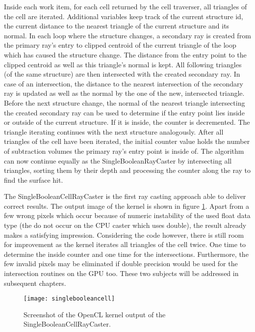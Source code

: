 Inside each work item, for each cell returned by the cell traverser, all triangles of the cell are iterated. Additional variables keep track of the current structure id, the current distance to the nearest triangle of the current structure and its normal. In each loop where the structure changes, a secondary ray is created from the primary ray's entry to clipped centroid of the current triangle of the loop which has caused the structure change. The distance from the entry point to the clipped centroid as well as this triangle's normal is kept. All following triangles (of the same structure) are then intersected with the created secondary ray. In case of an intersection, the distance to the nearest intersection of the secondary ray is updated as well as the normal by the one of the new, intersected triangle. Before the next structure change, the normal of the nearest triangle intersecting the created secondary ray can be used to determine if the entry point lies inside or outside of the current structure. If it is inside, the counter is decremented. The triangle iterating continues with the next structure analogously. After all triangles of the cell have been iterated, the initial counter value holds the number of subtraction volumes the primary ray's entry point is inside of. The algorithm can now continue equally as the SingleBooleanRayCaster by intersecting all triangles, sorting them by their depth and processing the counter along the ray to find the surface hit.

The SingleBooleanCellRayCaster is the first ray casting approach able to deliver correct results. The output image of the kernel is shown in figure \ref{fig:singlebooleancell}. Apart from a few wrong pixels which occur because of numeric instability of the used float data type (the do not occur on the CPU caster which uses double), the result already makes a satisfying impression. Considering the code however, there is still room for improvement as the kernel iterates all triangles of the cell twice. One time to determine the inside counter and one time for the intersections. Furthermore, the few invalid pixels may be eliminated if double precision would be used for the intersection routines on the GPU too. These two subjects will be addressed in subsequent chapters.

\begin{figure}
\centering
\texttt{[image: singlebooleancell]}
\caption{Screenshot of the OpenCL kernel output of the SingleBooleanCellRayCaster.}
\label{fig:singlebooleancell}
\end{figure}

